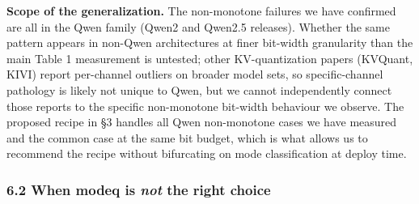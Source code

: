 \textbf{Scope of the generalization.} The non-monotone failures we have
confirmed are all in the Qwen family (Qwen2 and Qwen2.5 releases).
Whether the same pattern appears in non-Qwen architectures at finer
bit-width granularity than the main Table 1 measurement is untested;
other KV-quantization papers (KVQuant, KIVI) report per-channel outliers
on broader model sets, so specific-channel pathology is likely not
unique to Qwen, but we cannot independently connect those reports to the
specific non-monotone bit-width behaviour we observe. The proposed
recipe in §3 handles all Qwen non-monotone cases we have measured and
the common case at the same bit budget, which is what allows us to
recommend the recipe without bifurcating on mode classification at
deploy time.

\subsubsection{\texorpdfstring{6.2 When modeq is \emph{not} the right
choice}{6.2 When modeq is not the right choice}}\label{when-modeq-is-not-the-right-choice}

